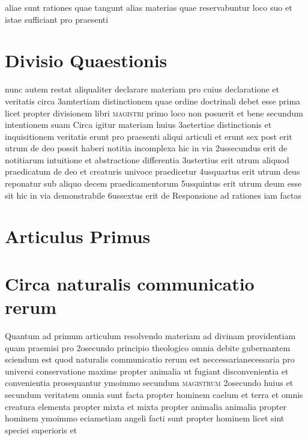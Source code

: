 \documentclass[twoside, openright]{report}
\newcommand{\name}[1]{\textsc{#1}}
\begin{document}
        \pstart
        aliae sunt rationes quae tangunt alias materias quae reservabuntur loco suo et istae sufficiant pro praesenti
        \pend
       
        \bigskip
         \section*{Divisio Quaestionis} 
        \pstart
        nunc autem restat aliqualiter declarare materiam pro cuius declaratione et veritatis circa 3amtertiam distinctionem quae ordine doctrinali debet esse prima licet propter divisionem libri \name{magistri} primo loco non posuerit et bene secundum intentionem suam Circa igitur materiam huius 3aetertiae distinctionis et inquisitionem veritatis erunt pro praesenti aliqui articuli et erunt sex post erit utrum de deo possit haberi notitia incomplexa hic in via 2ussecundus erit de notitiarum intuitione et abstractione differentia 3ustertius erit utrum aliquod praedicatum de deo et creaturis univoce praedicetur 4usquartus erit utrum deus reponatur sub aliquo decem praedicamentorum 5usquintus erit utrum deum esse sit hic in via demonstrabile 6ussextus erit de Responsione ad rationes iam factas
        \pend
      
        \bigskip
         \section*{Articulus Primus} 
        \bigskip
         \section*{Circa naturalis communicatio rerum} 
        \pstart
        Quantum ad primum articulum resolvendo materiam ad divinam providentiam quam praemisi pro 2osecundo principio theologico omnia debite gubernantem sciendum est quod naturalis communicatio rerum est neccessarianecessaria pro universi conservatione maxime propter animalia ut fugiant disconvenientia et convenientia prosequantur ymoimmo secundum \name{magistrum}\index[persons]{} 2osecundo huius et secundum veritatem omnia sunt facta propter hominem caelum et terra et omnis creatura elementa propter mixta et mixta propter animalia animalia propter hominem ymoimmo eciametiam angeli facti sunt propter hominem licet sint speciei superioris et 
        \pend
     
\end{document}
